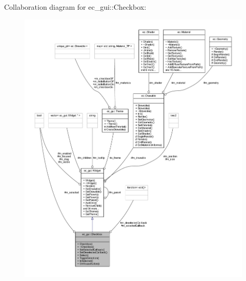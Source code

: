 Collaboration diagram for ec\+\_\+gui\+:\+:Checkbox\+:
\nopagebreak
\begin{figure}[H]
\begin{center}
\leavevmode
\includegraphics[width=350pt]{classec__gui_1_1_checkbox__coll__graph}
\end{center}
\end{figure}
